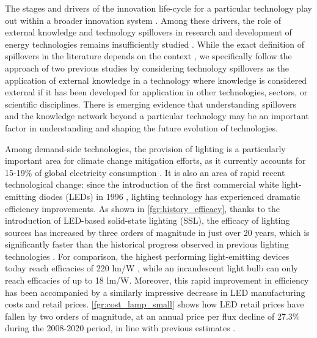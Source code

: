 \documentclass[parskip=full]{article}
\begin{document}
The stages and drivers of the innovation life-cycle for a particular technology play out within a broader innovation system \cite{grubler2012policies, Anadon2016}. Among these drivers, the role of external knowledge and technology spillovers in research and development of energy technologies remains insufficiently studied \cite{Stephan2021}. While the exact definition of spillovers in the literature depends on the context \cite{Nemet2012, kolesnikov2021spillovers}, we specifically follow the approach of two previous studies \cite{Stephan2021, kolesnikov2021spillovers} by considering technology spillovers as the application of external knowledge in a technology where knowledge is considered external if it has been developed for application in other technologies, sectors, or scientific disciplines. There is emerging evidence that understanding spillovers and the knowledge network beyond a particular technology may be an important factor in understanding \cite{Pichler2020, iea2020cleanenergy} and shaping \cite{Clark2016, Stephan2021} the future evolution of technologies.

Among demand-side technologies, the provision of lighting is a particularly important area for climate change mitigation efforts, as it currently   accounts for 15-19\% of global electricity consumption \cite{Zissis2016,doe_electricity}. It is also an area of rapid recent technological change: since the introduction of the first commercial white light-emitting diodes (LEDs) in 1996 \cite{Nakamura2013}, lighting technology has experienced dramatic efficiency improvements.  As shown in  \cref{fgr:history_efficacy}, thanks to the introduction of LED-based solid-state lighting (SSL), the efficacy of lighting sources has increased by three orders of magnitude in just over 20 years, which is significantly faster than the historical progress observed in previous lighting technologies \cite{weinold2021quantifying}. For comparison, the highest performing light-emitting devices today reach efficacies of 220 lm/W \cite{lumistrips2021mid}, while an incandescent light bulb can only reach efficacies of up to 18 lm/W. Moreover, this rapid improvement in efficiency has been accompanied by a similarly impressive decrease in LED manufacturing costs and retail prices. \cref{fgr:cost_lamp_small} shows how LED retail prices have fallen by two orders of magnitude, at an annual price per flux decline of 27.3\% during the 2008-2020 period, in line with previous estimates \cite{Gerke2020}.
\end{document}
